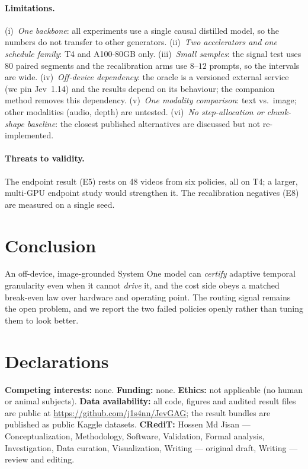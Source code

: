 \documentclass[journal]{IEEEtran}
\begin{document}
\paragraph{Limitations.}
(i)~\emph{One backbone}: all experiments use a single causal distilled model, so the numbers do not
transfer to other generators. (ii)~\emph{Two accelerators and one schedule family}: T4 and A100-80GB
only. (iii)~\emph{Small samples}: the signal test uses 80 paired segments and the recalibration arms use
$8$--$12$ prompts, so the intervals are wide. (iv)~\emph{Off-device dependency}: the oracle is a versioned
external service (we pin Jev~1.14) and the results depend on its behaviour; the companion method removes
this dependency. (v)~\emph{One modality comparison}: text vs.\ image; other modalities (audio, depth) are
untested. (vi)~\emph{No step-allocation or chunk-shape baseline}: the closest published alternatives
are discussed but not re-implemented.

\paragraph{Threats to validity.}
The endpoint result (E5) rests on 48 videos from six policies, all on T4; a larger, multi-GPU endpoint
study would strengthen it. The recalibration negatives (E8) are measured on a single seed.

\section{Conclusion}
An off-device, image-grounded System One model can \emph{certify} adaptive temporal granularity even
when it cannot \emph{drive} it, and the cost side obeys a matched break-even law over hardware and
operating point. The routing signal remains the open problem, and we report the two failed policies
openly rather than tuning them to look better.

\section*{Declarations}
\textbf{Competing interests:} none. \textbf{Funding:} none. \textbf{Ethics:} not applicable (no human or
animal subjects). \textbf{Data availability:} all code, figures and audited result files are public at
\url{https://github.com/j1s4nn/JevGAG}; the result bundles are published as public Kaggle datasets.
\textbf{CRediT:} Hossen Md Jisan --- Conceptualization, Methodology, Software, Validation, Formal
analysis, Investigation, Data curation, Visualization, Writing --- original draft, Writing --- review and
editing.



\end{document}
